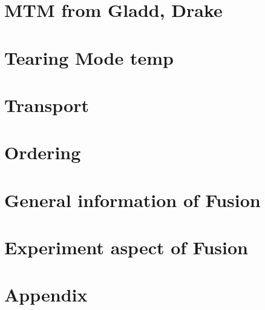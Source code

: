 \documentclass[12pt]{report}
\begin{document}
\chapter{MTM from Gladd, Drake}


%

\chapter{Tearing Mode temp}


\chapter{Transport}


\chapter{Ordering}


\chapter{General information of Fusion}


\chapter{Experiment aspect of Fusion}


\chapter{Appendix}


\medskip
 
\printbibliography
\end{document}

